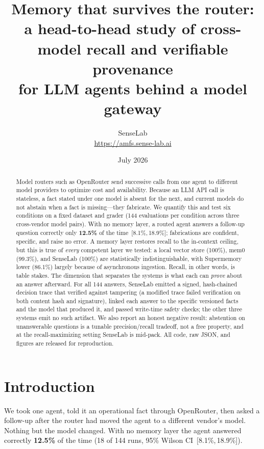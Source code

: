 \documentclass[11pt]{article}
\title{\vspace{-2.2em}\bfseries Memory that survives the router:\\[0.2em]
\large a head-to-head study of cross-model recall and verifiable provenance\\
for LLM agents behind a model gateway}
\author{SenseLab\\[0.3em]\normalsize\url{https://amfs.sense-lab.ai}}
\date{July 2026}
\newcommand{\ci}[2]{\,[#1,\,#2]}
\begin{document}
\maketitle
\vspace{-1.2em}

\begin{abstract}
\noindent
Model routers such as OpenRouter send successive calls from one agent to different
model providers to optimize cost and availability. Because an LLM API call is stateless,
a fact stated under one model is absent for the next, and current models do not abstain
when a fact is missing---they fabricate. We quantify this and test six conditions on a
fixed dataset and grader (144 evaluations per condition across three cross-vendor model
pairs). With no memory layer, a routed agent answers a follow-up question correctly only
\textbf{12.5\%} of the time \ci{8.1\%}{18.9\%}; fabrications are confident, specific, and
raise no error. A memory layer restores recall to the in-context ceiling, but this is
true of \emph{every} competent layer we tested: a local vector store (100\%), mem0
(99.3\%), and SenseLab (100\%) are statistically indistinguishable, with Supermemory lower
(86.1\%) largely because of asynchronous ingestion. Recall, in other words, is table
stakes. The dimension that separates the systems is what each can \emph{prove} about an
answer afterward. For all 144 answers, SenseLab emitted a signed, hash-chained decision trace
that verified against tampering (a modified trace failed verification on both content
hash and signature), linked each answer to the specific versioned facts and the model
that produced it, and passed write-time safety checks; the other three systems emit no
such artifact. We also report an honest negative result: abstention on unanswerable
questions is a tunable precision/recall tradeoff, not a free property, and at the
recall-maximizing setting SenseLab is mid-pack. All code, raw JSON, and figures are released
for reproduction.
\end{abstract}

\section{Introduction}

We took one agent, told it an operational fact through OpenRouter, then asked a follow-up
after the router had moved the agent to a different vendor's model. Nothing but the model
changed. With no memory layer the agent answered correctly \textbf{12.5\%} of the time
(18 of 144 runs, 95\% Wilson CI \ci{8.1\%}{18.9\%}).
\end{document}
